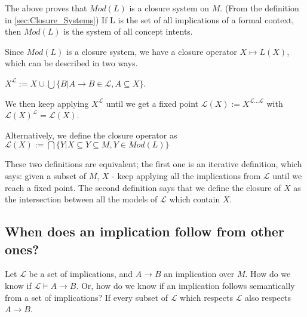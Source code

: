 The above proves that $Mod(L)$ is a closure system on $M$. (From the definition in \ref{sec:Closure_Systems}) If L is the set of all implications of a formal context, then $Mod(L)$ is the system of all concept intents. 

Since $Mod(L)$ is a closure system, we have a closure operator $X \mapsto L(X)$, which can be described in two ways. 

$X^\mathcal{L} := X \cup \bigcup\{B | A \rightarrow B \in \mathcal{L}, A \subseteq X\}$. 

We then keep applying $X^\mathcal{L}$ until we get a fixed point $\mathcal{L}(X) := X^{\mathcal{L}\dots \mathcal{L}}$ with $\mathcal{L}(X)^\mathcal{L} = \mathcal{L}(X)$. 

Alternatively, we define the closure operator as $\mathcal{L}(X) := \bigcap\{Y | X \subseteq Y \subseteq M, Y \in Mod(L)\}$ 

These two definitions are equivalent; the first one is an iterative definition, which says: given a subset of $M$, $X$ - keep applying all the implications from $\mathcal{L}$ until we reach a fixed point. The second definition says that we define the closure of $X$ as the intersection between all the models of $\mathcal{L}$ which contain $X$. 
\clearpage

\subsection{When does an implication follow from other ones?}
Let $\mathcal{L}$ be a set of implications, and $A\rightarrow B$ an implication over $M$. How do we know if $\mathcal{L} \models A\rightarrow B$. Or, how do we know if an implication follows semantically from a set of implications? If every subset of $\mathcal{L}$ which respects $\mathcal{L}$ also respects $A\rightarrow B$. 

